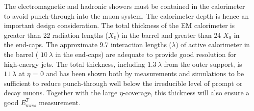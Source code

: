 	The electromagnetic and hadronic showers must be contained in the 
	calorimeter to avoid punch-through into the muon system. 
	The calorimeter depth is hence an important design consideration. 
	The total thickness of the EM calorimeter is greater than
	22 radiation lengths ($X_0$) in the barrel and greater than 
	24 $X_0$ in the end-caps. The approximate 9.7 interaction 
	lengths ($\lambda$) of active calorimeter in 
	the barrel ( $10\ \lambda$ in the end-caps) are adequate to 
	provide good resolution for high-energy jets. The total thickness, 
	including $1.3\ \lambda$ from the outer support, is $11\ \lambda$
	at $\eta$ = 0 and has been shown both by measurements and simulations 
	to be sufficient to reduce punch-through well below the irreducible 
	level of prompt or decay muons. Together with the large
	\mbox{$\eta$-coverage}, this thickness will also ensure a good $E_{miss}^T$ 
	measurement.

